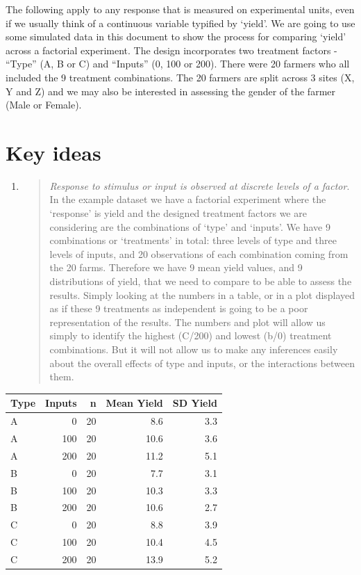 \documentclass[
]{book}
\begin{document}
The following apply to any response that is measured on experimental units, even if we usually think of a continuous variable typified by `yield'. We are going to use some simulated data in this document to show the process for comparing `yield' across a factorial experiment. The design incorporates two treatment factors - ``Type'' (A, B or C) and ``Inputs'' (0, 100 or 200). There were 20 farmers who all included the 9 treatment combinations. The 20 farmers are split across 3 sites (X, Y and Z) and we may also be interested in assessing the gender of the farmer (Male or Female).

\hypertarget{key-ideas}{%
\section{Key ideas}\label{key-ideas}}

\begin{enumerate}
\def\labelenumi{\arabic{enumi}.}
\item
  \begin{quote}
  \emph{Response to stimulus or input is observed at discrete levels of a factor}. In the example dataset we have a factorial experiment where the `response' is yield and the designed treatment factors we are considering are the combinations of `type' and `inputs'.
  We have 9 combinations or `treatments' in total: three levels of type and three levels of inputs, and 20 observations of each combination coming from the 20 farms. Therefore we have 9 mean yield values, and 9 distributions of yield, that we need to compare to be able to assess the results. Simply looking at the numbers in a table, or in a plot displayed as if these 9 treatments as independent is going to be a poor representation of the results. The numbers and plot will allow us simply to identify the highest (C/200) and lowest (b/0) treatment combinations. But it will not allow us to make any inferences easily about the overall effects of type and inputs, or the interactions between them.
  \end{quote}
\end{enumerate}

\begin{tabular}{l|r|r|r|r}
\hline
Type & Inputs & n & Mean Yield & SD Yield\\
\hline
A & 0 & 20 & 8.6 & 3.3\\
\hline
A & 100 & 20 & 10.6 & 3.6\\
\hline
A & 200 & 20 & 11.2 & 5.1\\
\hline
B & 0 & 20 & 7.7 & 3.1\\
\hline
B & 100 & 20 & 10.3 & 3.3\\
\hline
B & 200 & 20 & 10.6 & 2.7\\
\hline
C & 0 & 20 & 8.8 & 3.9\\
\hline
C & 100 & 20 & 10.4 & 4.5\\
\hline
C & 200 & 20 & 13.9 & 5.2\\
\hline
\end{tabular}
\end{document}
